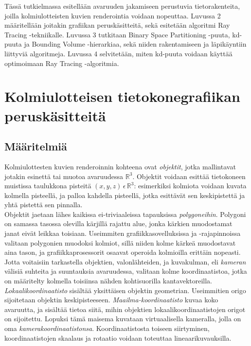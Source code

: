 \documentclass[a4paper,12pt, titlepage]{article}
\theoremstyle{break}
\newcommand{\R}{\mathbb{R}}
\begin{document}
Tässä tutkielmassa esitellään avaruuden jakamiseen perustuvia tietorakenteita, joilla kolmiulotteisten kuvien renderointia voidaan nopeuttaa. Luvussa 2 määritellään joitakin grafiikan peruskäsitteitä, sekä esitetään algoritmi Ray Tracing -tekniikalle. Luvussa 3 tutkitaan Binary Space Partitioning -puuta, kd-puuta ja Bounding Volume -hierarkiaa, sekä niiden rakentamiseen ja läpikäyntiin liittyviä algoritmeja. Luvussa 4 selvitetään, miten kd-puuta voidaan käyttää optimoimaan Ray Tracing -algoritmia.


\newpage
\section{Kolmiulotteisen tietokonegrafiikan peruskäsitteitä}
\subsection{Määritelmiä}

Kolmiulottesten kuvien renderoinnin kohteena ovat \emph{objektit}, jotka mallintavat jotakin esinettä tai muotoa avaruudessa $\R^3$. Objektit voidaan esittää tietokoneen muistissa taulukkona pisteitä $(x,y,z)\,\epsilon\,\R^3$: esimerkiksi kolmiota voidaan kuvata kolmella pisteellä, ja palloa kahdella pisteellä, jotka esittävät sen keskipistettä ja yhtä pistettä sen pinnalla.\cite{angel}\\

Objektit jaetaan lähes kaikissa ei-triviaaleissa tapauksissa \emph{polygoneihin}. Polygoni on samassa tasossa olevilla kärjillä rajattu alue, jonka kärkien muodostamat janat eivät leikkaa toisiaan. Useimmiten grafiikkasovelluksissa ja -rajapinnoissa valitaan polygonien muodoksi kolmiot, sillä niiden kolme kärkeä muodostavat aina tason, ja grafiikkaprosessorit osaavat operoida kolmioilla erittäin nopeasti.\cite{angel}\\

Jotta voitaisiin tarkastella objektien, valonlähteiden, ja kuvakulman, eli \emph{kameran} välisiä suhteita ja suuntauksia avaruudessa, valitaan kolme koordinaatistoa, jotka on määritelty kolmella toisiinsa nähden kohtisuorilla kantavektoreilla. \emph{Lokaalikoordinaatisto} sisältää yksittäisen objektin geometrian. Useimmitien origo sijoitetaan objektin keskipisteeseen. \emph{Maailma-koordinaatisto} kuvaa koko avaruutta, ja sisältää tietoa siitä, mihin objektien lokaalikoordinaatistojen origot on sijoitettu. Lopuksi tämä maisema kuvataan virtuaalisella kameralla, jolla on oma \emph{kamerakoordinaatistonsa}. Koordinaatistosta toiseen siirtyminen, koordinaatistojen skaalaus ja rotaatio voidaan toteuttaa lineaarikuvauksilla.\cite{janke}
\end{document}
